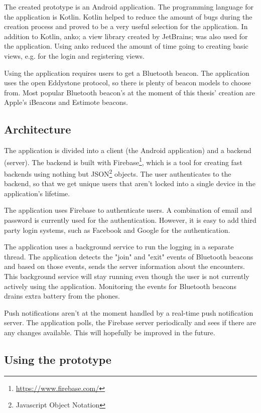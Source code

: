 The created prototype is an Android application. The programming language for the application is Kotlin. Kotlin helped to reduce the amount of bugs during the creation process and proved to be a very useful selection for the application. In addition to Kotlin, anko; a view library created by JetBrains; was also used for the application. Using anko reduced the amount of time going to creating basic views, e.g. for the login and registering views.

Using the application requires users to get a Bluetooth beacon. The application uses the open  Eddystone protocol, so there is plenty of beacon models to choose from. Most popular Bluetooth beacon's at the moment of this thesis' creation are Apple's iBeacons and Estimote beacons.

\subsection{Architecture}

The application is divided into a client (the Android application) and a backend (server). The backend is built with Firebase\footnote{\url{https://www.firebase.com/}}, which is a tool for creating fast backends using nothing but JSON\footnote{Javascript Object Notation} objects. The user authenticates to the backend, so that we get unique users that aren't locked into a single device in the application's lifetime.

The application uses Firebase to authenticate users. A combination of email and password is currently used for the authentication. However, it is easy to add third party login systems, such as Facebook and Google for the authentication.

The application uses a background service to run the logging in a separate thread. The application detects the "join" and "exit" events of Bluetooth beacons and based on those events, sends the server information about the encounters. This background service will stay running even though the user is not currently actively using the application. Monitoring the events for Bluetooth beacons drains extra battery from the phones.

Push notifications aren't at the moment handled by a real-time push notification server. The application polls, the Firebase server periodically and sees if there are any changes available. This will hopefully be improved in the future.

\subsection{Using the prototype}

